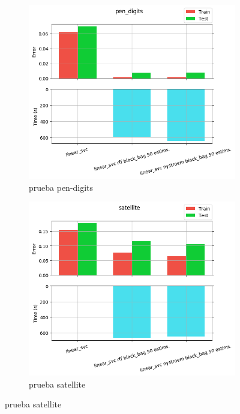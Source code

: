 \begin{figure}[ht]
  \centering
  \begin{subfigure}[b]{0.5\linewidth}
    \centering\includegraphics[width=\imgscale\linewidth]{Figures/2_6/pen_digits}
    \caption{prueba pen-digits}
    \label{fig:2_6_pen_digits}
  \end{subfigure}%
  \begin{subfigure}[b]{0.5\linewidth}
    \centering\includegraphics[width=\imgscale\linewidth]{Figures/2_6/satellite}
    \caption{prueba satellite}
    \label{fig:2_6_satellite}
  \end{subfigure}
\end{figure}

